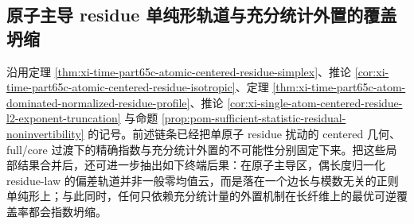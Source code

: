 \subsection{原子主导 residue 单纯形轨道与充分统计外置的覆盖坍缩}\label{subsec:conclusion-fullresidue-simplex-sufficient-externalization-collapse}
沿用定理 \ref{thm:xi-time-part65c-atomic-centered-residue-simplex}、推论 \ref{cor:xi-time-part65c-atomic-centered-residue-isotropic}、定理 \ref{thm:xi-time-part65c-atom-dominated-normalized-residue-profile}、推论 \ref{cor:xi-single-atom-centered-residue-l2-exponent-truncation} 与命题 \ref{prop:pom-sufficient-statistic-residual-noninvertibility} 的记号。前述链条已经把单原子 residue 扰动的 centered 几何、full/core 过渡下的精确指数与充分统计外置的不可能性分别固定下来。把这些局部结果合并后，还可进一步抽出如下终端后果：在原子主导区，偶长度归一化 residue-law 的偏差轨道并非一般零均值云，而是落在一个边长与模数无关的正则单纯形上；与此同时，任何只依赖充分统计量的外置机制在长纤维上的最优可逆覆盖率都会指数坍缩。

